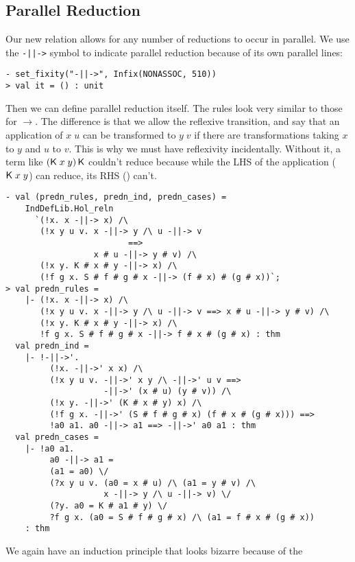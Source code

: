 \documentclass[12pt]{article}
\newcommand{\KC}{\con{K}}
\begin{document}
\subsection{Parallel Reduction}
\label{sec:Parallel-Reduction}

Our new relation allows for any number of reductions to occur in
parallel.  We use the \texttt{-||->} symbol to indicate parallel
reduction because of its own parallel lines:
\begin{session}\begin{verbatim}
- set_fixity("-||->", Infix(NONASSOC, 510))
> val it = () : unit
\end{verbatim}\end{session}
    Then we can define parallel reduction itself.  The rules look very
    similar to those for $\rightarrow$.  The difference is that we
    allow the reflexive transition, and say that an application of
    $x\;u$ can be transformed to $y\;v$ if there are transformations
    taking $x$ to $y$ and $u$ to $v$.  This is why we must have
    reflexivity incidentally.  Without it, a term like
    $(\KC\;x\;y)\,\KC$ couldn't reduce because while the LHS of the
    application ($\KC\;x\;y$) can reduce, its RHS (\KC) can't.
\begin{session}\begin{verbatim}
- val (predn_rules, predn_ind, predn_cases) =
    IndDefLib.Hol_reln
      `(!x. x -||-> x) /\
       (!x y u v. x -||-> y /\ u -||-> v
                         ==>
                  x # u -||-> y # v) /\
       (!x y. K # x # y -||-> x) /\
       (!f g x. S # f # g # x -||-> (f # x) # (g # x))`;
> val predn_rules =
    |- (!x. x -||-> x) /\
       (!x y u v. x -||-> y /\ u -||-> v ==> x # u -||-> y # v) /\
       (!x y. K # x # y -||-> x) /\
       !f g x. S # f # g # x -||-> f # x # (g # x) : thm
  val predn_ind =
    |- !-||->'.
         (!x. -||->' x x) /\
         (!x y u v. -||->' x y /\ -||->' u v ==>
                    -||->' (x # u) (y # v)) /\
         (!x y. -||->' (K # x # y) x) /\
         (!f g x. -||->' (S # f # g # x) (f # x # (g # x))) ==>
         !a0 a1. a0 -||-> a1 ==> -||->' a0 a1 : thm
  val predn_cases =
    |- !a0 a1.
         a0 -||-> a1 =
         (a1 = a0) \/
         (?x y u v. (a0 = x # u) /\ (a1 = y # v) /\
                    x -||-> y /\ u -||-> v) \/
         (?y. a0 = K # a1 # y) \/
         ?f g x. (a0 = S # f # g # x) /\ (a1 = f # x # (g # x))
    : thm
\end{verbatim}\end{session}
We again have an induction principle that looks bizarre because of the
\end{document}
